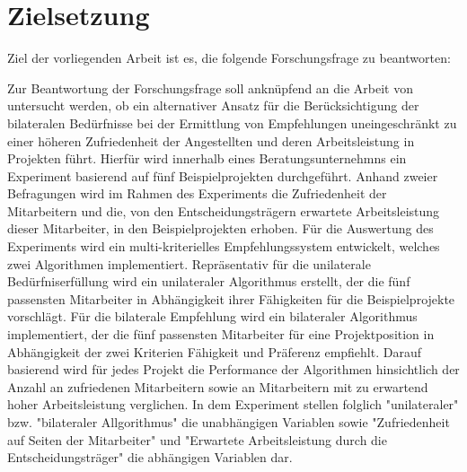 \section{Zielsetzung}
\label{sec:einletung:zielsetzung}
Ziel der vorliegenden Arbeit ist es, die folgende Forschungsfrage zu beantworten:

\forschungsfrage

Zur Beantwortung der Forschungsfrage soll anknüpfend an die Arbeit von \textcite[S. iii]{link:booklet} untersucht werden, ob ein alternativer Ansatz für die Berücksichtigung der bilateralen Bedürfnisse bei der Ermittlung von Empfehlungen uneingeschränkt zu einer höheren Zufriedenheit der Angestellten und deren Arbeitsleistung in Projekten führt.
Hierfür wird innerhalb eines Beratungsunternehmns ein Experiment basierend auf fünf Beispielprojekten durchgeführt.
Anhand zweier Befragungen wird im Rahmen des Experiments die Zufriedenheit der Mitarbeitern und die, von den Entscheidungsträgern erwartete Arbeitsleistung dieser Mitarbeiter, in den Beispielprojekten erhoben.
Für die Auswertung des Experiments wird ein multi-kriterielles Empfehlungssystem entwickelt, welches zwei Algorithmen implementiert.
Repräsentativ für die unilaterale Bedürfniserfüllung wird ein unilateraler Algorithmus erstellt, der die fünf passensten Mitarbeiter in Abhängigkeit ihrer Fähigkeiten für die Beispielprojekte vorschlägt.
Für die bilaterale Empfehlung wird ein bilateraler Algorithmus implementiert, der die fünf passensten Mitarbeiter für eine Projektposition in Abhängigkeit der zwei Kriterien Fähigkeit und Präferenz empfiehlt.
Darauf basierend wird für jedes Projekt die Performance der Algorithmen hinsichtlich der Anzahl an zufriedenen Mitarbeitern sowie an Mitarbeitern mit zu erwartend hoher Arbeitsleistung verglichen.
In dem Experiment stellen folglich "unilateraler" bzw. "bilateraler Allgorithmus" die unabhängigen Variablen sowie "Zufriedenheit auf Seiten der Mitarbeiter" und "Erwartete Arbeitsleistung durch die Entscheidungsträger" die abhängigen Variablen dar.


